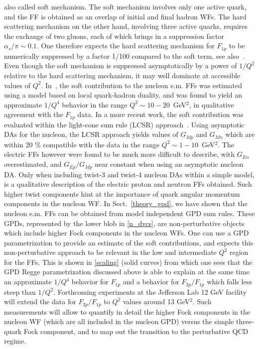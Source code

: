 also called soft mechanism. The soft mechanism involves only one active 
quark, and the FF is obtained as an overlap of initial and final 
hadron WFs. 
The hard scattering mechanism on the other hand, 
involving three active quarks, requires the exchange of two gluons, each of 
which brings in a suppression factor $\alpha_s / \pi \sim 0.1$. One therefore 
expects the hard scattering mechanism for $F_{1 p}$  
to be numerically suppressed by a factor 1/100 compared to the soft term, see 
also~\cite{bolz,kroll}. 
Even though the soft mechanism is suppressed asymptotically by a power of 
$1/Q^2$ relative to the hard scattering mechanism, 
it may well dominate at accessible values of $Q^2$.
In~\cite{Nesterenko:1983ef}, the soft contribution 
to the nucleon e.m. FFs was 
estimated using a model based on local quark-hadron duality, and  
was found to yield an approximate $1/Q^4$ behavior 
in the range $Q^2 \sim 10 - 20$~GeV$^2$, 
in qualitative agreement with the $F_{1p}$ data. 
\newline
\indent
In a more recent work, the soft contribution  
was evaluated within the light-cone sum rule (LCSR) approach~\cite{braun06}. 
Using asymptotic DAs for the nucleon, 
the LCSR approach yields values of $G_{Mp}$ and 
$G_{Mn}$ which are within 20 \% compatible with the data in the range 
$Q^2 \sim 1 - 10$~GeV$^2$. The electric FFs however were found to be much
more difficult to describe, with $G_{En}$ overestimated, and 
$G_{Ep}/G_{Mp}$ near constant when using an asymptotic nucleon DA. 
Only when including twist-3 and twist-4 nucleon DAs within a simple model, 
is a qualitative description of the electric
proton and neutron FFs obtained. Such higher twist components hint at the
importance of quark angular momentum components in the nucleon WF. 
\newline
\indent
In Sect.~\ref{theory_gpd}, we have shown that the nucleon 
e.m. FFs can be obtained from model independent 
GPD sum rules. These GPDs, represented by the lower blob in 
\ref{n_dvcs}, are non-perturbative objects which include 
higher Fock components in the nucleon WFs. One 
can use a GPD parametrization to provide an estimate of the soft 
contributions, and expects this non-perturbative approach 
to be relevant in the low and intermediate $Q^2$ region for the FFs.  
This is shown in \ref{scaling} 
(solid curves) from which one sees that the GPD Regge parametrization  
discussed above is able to explain 
at the same time an approximate $1/Q^4$ 
behavior for $F_{1 p}$ and a behavior for $F_{2 p}/F_{1 p}$ 
which falls less steep than $1/Q^2$.  
Forthcoming experiments at the Jefferson Lab 12 GeV facility will extend the 
data for $F_{2 p}/F_{1 p}$ to $Q^2$ values around 
13 GeV$^2$. Such measurements will allow to quantify in detail the higher 
Fock components in the nucleon WF 
(which are all included in the nucleon GPD) versus 
the simple three-quark Fock component, and to map out the 
transition to the perturbative QCD regime. 


